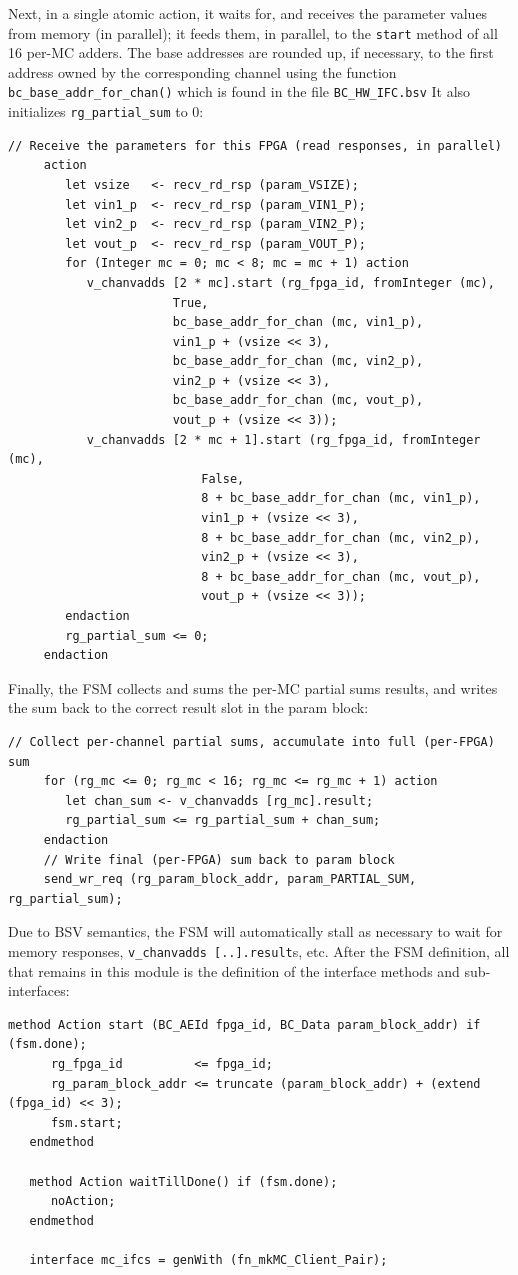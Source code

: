 \documentclass[twoside,letterpaper,11pt]{article}
\begin{document}
Next, in a single atomic action, it waits for, and receives the
parameter values from memory (in parallel); it feeds them, in
parallel, to the \verb|start| method of all 16 per-MC adders.  The base
addresses are rounded up, if necessary, to the first address owned by
the corresponding channel using the function
\verb|bc_base_addr_for_chan()| which is found in the file
\verb|BC_HW_IFC.bsv|
It also initializes \verb|rg_partial_sum| to 0:
\begin{Verbatim}[frame=single, label=App\_HW\_v0.bsv] 
	 // Receive the parameters for this FPGA (read responses, in parallel)
	 action
	    let vsize   <- recv_rd_rsp (param_VSIZE);
	    let vin1_p  <- recv_rd_rsp (param_VIN1_P);
	    let vin2_p  <- recv_rd_rsp (param_VIN2_P);
	    let vout_p  <- recv_rd_rsp (param_VOUT_P);
	    for (Integer mc = 0; mc < 8; mc = mc + 1) action
	       v_chanvadds [2 * mc].start (rg_fpga_id, fromInteger (mc),
					   True,
					   bc_base_addr_for_chan (mc, vin1_p),
					   vin1_p + (vsize << 3),
					   bc_base_addr_for_chan (mc, vin2_p),
					   vin2_p + (vsize << 3),
					   bc_base_addr_for_chan (mc, vout_p),
					   vout_p + (vsize << 3));
	       v_chanvadds [2 * mc + 1].start (rg_fpga_id, fromInteger (mc),
					       False,
					       8 + bc_base_addr_for_chan (mc, vin1_p),
					       vin1_p + (vsize << 3),
					       8 + bc_base_addr_for_chan (mc, vin2_p),
					       vin2_p + (vsize << 3),
					       8 + bc_base_addr_for_chan (mc, vout_p),
					       vout_p + (vsize << 3));
	    endaction
	    rg_partial_sum <= 0;
	 endaction
\end{Verbatim}
Finally, the FSM collects and sums the per-MC partial sums results,
and writes the sum back to the correct result slot in the param block:
\begin{Verbatim}[frame=single, label=App\_HW\_v0.bsv] 
	 // Collect per-channel partial sums, accumulate into full (per-FPGA) sum
	 for (rg_mc <= 0; rg_mc < 16; rg_mc <= rg_mc + 1) action
	    let chan_sum <- v_chanvadds [rg_mc].result;
	    rg_partial_sum <= rg_partial_sum + chan_sum;
	 endaction
	 // Write final (per-FPGA) sum back to param block
	 send_wr_req (rg_param_block_addr, param_PARTIAL_SUM, rg_partial_sum);
\end{Verbatim}
Due to BSV semantics, the FSM will automatically stall as necessary to
wait for memory responses, \verb|v_chanvadds [..].result|s, etc.
After the FSM definition, all that remains in this module is the
definition of the interface methods and sub-interfaces:
\begin{Verbatim}[frame=single, label=App\_HW\_v0.bsv] 
   method Action start (BC_AEId fpga_id, BC_Data param_block_addr) if (fsm.done);
      rg_fpga_id          <= fpga_id;
      rg_param_block_addr <= truncate (param_block_addr) + (extend (fpga_id) << 3);
      fsm.start;
   endmethod

   method Action waitTillDone() if (fsm.done);
      noAction;
   endmethod

   interface mc_ifcs = genWith (fn_mkMC_Client_Pair);
\end{Verbatim}
\end{document}
